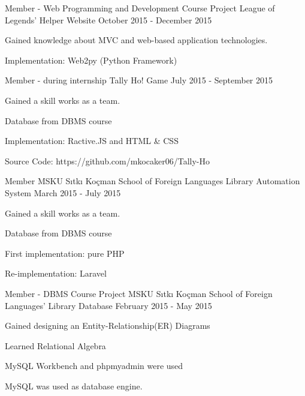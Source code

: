 \begin{cventries}
    \cventry
        {Member - Web Programming and Development Course Project}
        {League of Legends' Helper Website}
        {}
        {October 2015 - December 2015}
        {
            \begin{cvitems}
                \item {Gained knowledge about MVC and web-based application technologies.}
                \item {Implementation: Web2py (Python Framework)}
            \end{cvitems}
        }

    \cventry
        {Member - during internship}
        {Tally Ho! Game}
        {}
        {July 2015 - September 2015}
        {
            \begin{cvitems}
                \item {Gained a skill works as a team.}
                \item {Database from DBMS course}
                \item {Implementation: Ractive.JS and HTML \& CSS} 
                \item {Source Code: https://github.com/mkocaker06/Tally-Ho} 
            \end{cvitems}
        }

    \cventry
        {Member}
        {MSKU Sıtkı Koçman School of Foreign Languages Library Automation System}
        {}
        {March 2015 - July 2015}
        {
            \begin{cvitems}
                \item {Gained a skill works as a team.}
                \item {Database from DBMS course}
                \item {First implementation: pure PHP}
                \item {Re-implementation: Laravel}
            \end{cvitems}
        }

    \cventry
        {Member - DBMS Course Project}
        {MSKU Sıtkı Koçman School of Foreign Languages' Library Database}
        {}
        {February 2015 - May 2015}
        {
            \begin{cvitems}
                \item {Gained designing an Entity-Relationship(ER) Diagrams}
                \item {Learned Relational Algebra}
                \item {MySQL Workbench and phpmyadmin were used}
                \item {MySQL was used as database engine.}
            \end{cvitems}
        }

\end{cventries}
